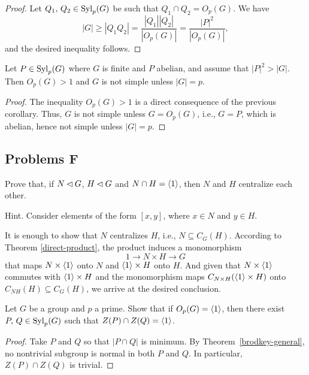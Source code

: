 \begin{proof} Let $Q_1,\,Q_2\in{\rm Syl}_p(G)$ be such that $Q_1\cap Q_2=O_p(G)$. We have
$$
    |G| \ge |Q_1Q_2|=\frac{|Q_1||Q_2|}{|O_p(G)|}=\frac{|P|^2}{|O_p(G)|},
$$
and the desired inequality follows.  \end{proof}

\begin{cor}
    Let\/ $P\in{\rm Syl}_p(G)$ where\/ $G$ is finite and\/ $P$ abelian, and assume that $|P|^2>|G|$. Then $O_p(G)>1$ and\/ $G$ is not simple unless $|G|=p$.
\end{cor}

\begin{proof} The inequality $O_p(G)>1$ is a direct consequence of the previous corollary. Thus, $G$ is not simple unless $G=O_p(G)$, i.e., $G=P$, which is abelian, hence not simple unless $|G|=p$.  \end{proof}

\subsection{Problems F}

\begin{probl}\label{problem-1.F.1}
    Prove that, if\/ $N\lhd G$, $H\lhd G$ and\/ $N\cap H=\langle1\rangle$, then\/ $N$ and\/ $H$ centralize each other.

    \textrm{\rm Hint. Consider elements of the form $[x,y]$, where $x\in N$ and $y\in H$.}
\end{probl}

\begin{solution} It is enough to show that $N$ centralizes $H$, i.e., $N\subseteq C_G(H)$. According to Theorem \ref{direct-product}, the product induces a monomorphism
$$
    1\to N\times H\to G
$$
that maps $N\times\langle1\rangle$ onto $N$ and $\langle1\rangle\times H$ onto $H$. And given that $N\times\langle1\rangle$ commutes with $\langle1\rangle\times H$ and the monomorphism maps $C_{N\times H}(\langle1\rangle\times H)$ onto $C_{NH}(H)\subseteq C_G(H)$, we arrive at the desired conclusion.  \end{solution}

\begin{probl}
    Let\/ $G$ be a group and\/ $p$ a prime. Show that if\/ $O_{p}(G)=\langle1\rangle$, then there exist $P,\,Q \in{\rm Syl}_{p}(G)$ such that $Z(P)\cap Z(Q)=\langle1\rangle$.
\end{probl}

\begin{proof} Take $P$ and $Q$ so that $|P\cap Q|$ is minimum. By Theorem~\ref{brodkey-general}, no nontrivial subgroup is normal in both $P$ and $Q$. In particular, $Z(P)\cap Z(Q)$ is trivial.  \end{proof}

